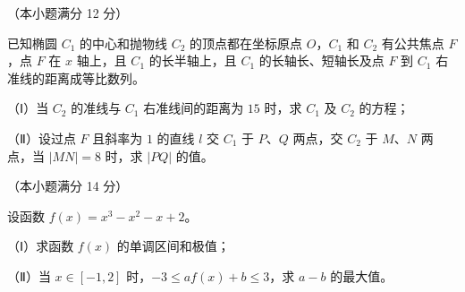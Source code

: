 \begin{question}
（本小题满分 12 分）

已知椭圆 $C_1$ 的中心和抛物线 $C_2$ 的顶点都在坐标原点 $O$，$C_1$ 和 $C_2$ 有公共焦点 $F$，点 $F$ 在 $x$ 轴上，且 $C_1$ 的长半轴上，且 $C_1$ 的长轴长、短轴长及点 $F$ 到 $C_1$ 右准线的距离成等比数列。

（Ⅰ）当 $C_2$ 的准线与 $C_1$ 右准线间的距离为 $15$ 时，求 $C_1$ 及 $C_2$ 的方程；

（Ⅱ）设过点 $F$ 且斜率为 $1$ 的直线 $l$ 交 $C_1$ 于 $P$、$Q$ 两点，交 $C_2$ 于 $M$、$N$ 两点，当 $|MN|=8$ 时，求 $|PQ|$ 的值。

\end{question}
\begin{question}
（本小题满分 14 分）

设函数 $f(x)=x^3-x^2-x+2$。

（Ⅰ）求函数 $f(x)$ 的单调区间和极值；

（Ⅱ）当 $x\in[-1,2]$ 时，$-3\leqslant af(x)+b\leqslant3$，求 $a-b$ 的最大值。

\end{question}
